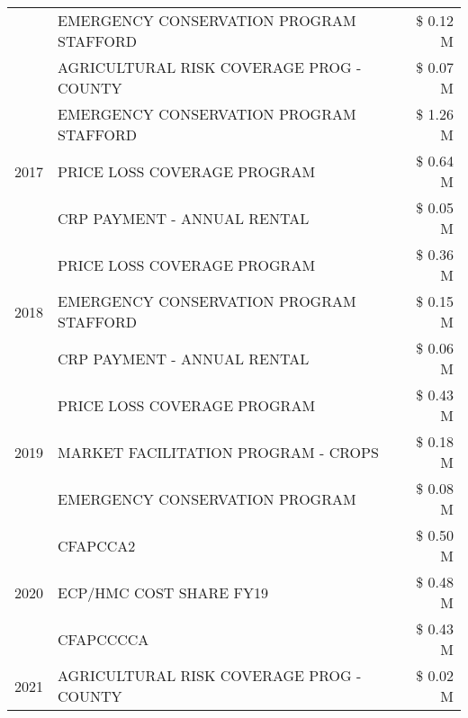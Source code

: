 \begin{tabular}{llr}
 & EMERGENCY CONSERVATION PROGRAM STAFFORD       & \$ 0.12 M \\
 & AGRICULTURAL RISK COVERAGE PROG - COUNTY      & \$ 0.07 M \\
\cline{1-3}
\multirow[t]{3}{*}{2017} & EMERGENCY CONSERVATION PROGRAM STAFFORD & \$ 1.26 M \\
 & PRICE LOSS COVERAGE PROGRAM & \$ 0.64 M \\
 & CRP PAYMENT - ANNUAL RENTAL & \$ 0.05 M \\
\cline{1-3}
\multirow[t]{3}{*}{2018} & PRICE LOSS COVERAGE PROGRAM & \$ 0.36 M \\
 & EMERGENCY CONSERVATION PROGRAM STAFFORD & \$ 0.15 M \\
 & CRP PAYMENT - ANNUAL RENTAL & \$ 0.06 M \\
\cline{1-3}
\multirow[t]{3}{*}{2019} & PRICE LOSS COVERAGE PROGRAM & \$ 0.43 M \\
 & MARKET FACILITATION PROGRAM - CROPS & \$ 0.18 M \\
 & EMERGENCY CONSERVATION PROGRAM & \$ 0.08 M \\
\cline{1-3}
\multirow[t]{3}{*}{2020} & CFAPCCA2 & \$ 0.50 M \\
 & ECP/HMC COST SHARE FY19 & \$ 0.48 M \\
 & CFAPCCCCA & \$ 0.43 M \\
\cline{1-3}
2021 & AGRICULTURAL RISK COVERAGE PROG - COUNTY & \$ 0.02 M \\
\cline{1-3}
\bottomrule
\end{tabular}
